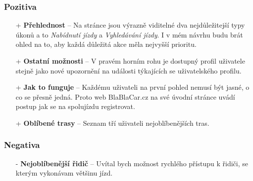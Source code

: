 \subsubsection*{Pozitiva}
\begin{itemize}
    \item[+] \textbf{Přehlednost} -- Na stránce jsou výrazně viditelné dva nejdůležitejší typy úkonů a to \textit{Nabídnutí jízdy} a \textit{Vyhledávání jízdy}. I v mém návrhu budu brát ohled na to, aby každá důležitá akce měla nejvyšší prioritu.
    \item[+] \textbf{Ostatní možnosti} -- V pravém horním rohu je dostupný profil uživatele stejně jako nové upozornění na události týkajících se uživatelského profilu.
    \item[+] \textbf{Jak to funguje} -- Každému uživateli na první pohled nemusí být jasné, o co se přesně jedná. Proto web BlaBlaCar.cz na své úvodní stránce uvádí postup jak se na spolujízdu registrovat.
    \item[+] \textbf{Oblíbené trasy} -- Seznam tří uživateli nejoblíbenějších tras.
\end{itemize}
\subsubsection*{Negativa}
\begin{itemize}
    \item[-] \textbf{Nejoblíbenější řidič} -- Uvítal bych možnost rychlého přístupu k řidiči, se kterým vykonávam většinu jízd.
\end{itemize}



\newpage
